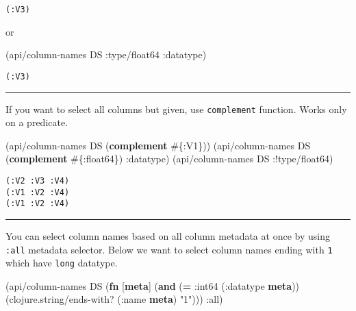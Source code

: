 \documentclass[]{article}
\newenvironment{Shaded}{\begin{snugshade}}{\end{snugshade}}
\newcommand{\KeywordTok}[1]{\textcolor[rgb]{0.13,0.29,0.53}{\textbf{#1}}}
\newcommand{\StringTok}[1]{\textcolor[rgb]{0.31,0.60,0.02}{#1}}
\newcommand{\AttributeTok}[1]{\textcolor[rgb]{0.77,0.63,0.00}{#1}}
\newcommand{\NormalTok}[1]{#1}
\begin{document}
\begin{verbatim}
(:V3)
\end{verbatim}

or

\begin{Shaded}
\begin{Highlighting}[]
\NormalTok{(api/column-names DS }\AttributeTok{:type/float64} \AttributeTok{:datatype}\NormalTok{)}
\end{Highlighting}
\end{Shaded}

\begin{verbatim}
(:V3)
\end{verbatim}

\begin{center}\rule{0.5\linewidth}{0.5pt}\end{center}

If you want to select all columns but given, use \texttt{complement}
function. Works only on a predicate.

\begin{Shaded}
\begin{Highlighting}[]
\NormalTok{(api/column-names DS (}\KeywordTok{complement}\NormalTok{ #\{}\AttributeTok{:V1}\NormalTok{\}))}
\NormalTok{(api/column-names DS (}\KeywordTok{complement}\NormalTok{ #\{}\AttributeTok{:float64}\NormalTok{\}) }\AttributeTok{:datatype}\NormalTok{)}
\NormalTok{(api/column-names DS :!type/float64)}
\end{Highlighting}
\end{Shaded}

\begin{verbatim}
(:V2 :V3 :V4)
(:V1 :V2 :V4)
(:V1 :V2 :V4)
\end{verbatim}

\begin{center}\rule{0.5\linewidth}{0.5pt}\end{center}

You can select column names based on all column metadata at once by
using \texttt{:all} metadata selector. Below we want to select column
names ending with \texttt{1} which have \texttt{long} datatype.

\begin{Shaded}
\begin{Highlighting}[]
\NormalTok{(api/column-names DS (}\KeywordTok{fn}\NormalTok{ [}\KeywordTok{meta}\NormalTok{]}
\NormalTok{                       (}\KeywordTok{and}\NormalTok{ (}\KeywordTok{=} \AttributeTok{:int64}\NormalTok{ (}\AttributeTok{:datatype} \KeywordTok{meta}\NormalTok{))}
\NormalTok{                            (clojure.string/ends-with? (}\AttributeTok{:name} \KeywordTok{meta}\NormalTok{) }\StringTok{"1"}\NormalTok{))) }\AttributeTok{:all}\NormalTok{)}
\end{Highlighting}
\end{Shaded}
\end{document}
